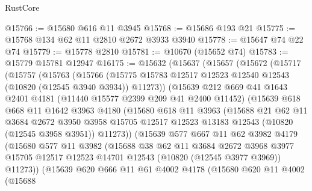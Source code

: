 \begin{lexlean}{RustCore}
\begin{coremodule}
@15766 := @15680 @616 @11 @3945
@15768 := @15686 @193 @21
@15775 := @15768 @134 @62 @11 @2810 @2672 @3933 @3940
@15778 := @15647 @74 @22 @74
@15779 := @15778 @2810
@15781 := @10670 (@15652 @74)
@15783 := @15779 @15781 @12947
@16175 := @15632
    (@15637
      (@15657
        (@15672
          (@15717
            (@15757
              (@15763
                (@15766
                  (@15775 @15783 @12517 @12523 @12540 @12543 (@10820 (@12545 @3940 @3934)) @11273))
                (@15639
                  @212
                  @669
                  @41
                  @1643
                  @2401
                  @4181
                  (@11440 @15577 @2399 @209 @41 @2400 @11452)
                  (@15639
                    @618
                    @668
                    @11
                    @1642
                    @3963
                    @4180
                    (@15680
                      @618
                      @11
                      @3963
                      (@15688
                        @21
                        @62
                        @11
                        @3684
                        @2672
                        @3950
                        @3958
                        @15705
                        @12517
                        @12523
                        @13183
                        @12543
                        (@10820 (@12545 @3958 @3951))
                        @11273))
                    (@15639
                      @577
                      @667
                      @11
                      @62
                      @3982
                      @4179
                      (@15680
                        @577
                        @11
                        @3982
                        (@15688
                          @38
                          @62
                          @11
                          @3684
                          @2672
                          @3968
                          @3977
                          @15705
                          @12517
                          @12523
                          @14701
                          @12543
                          (@10820 (@12545 @3977 @3969))
                          @11273))
                      (@15639
                        @620
                        @666
                        @11
                        @61
                        @4002
                        @4178
                        (@15680
                          @620
                          @11
                          @4002
                          (@15688

\end{coremodule}
\end{lexlean}
